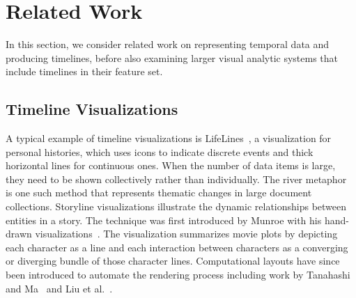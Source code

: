 \section{Related Work}
\label{sec:relatedwork}


In this section, we consider related work on representing temporal data and producing timelines, before also examining larger visual analytic systems that include timelines in their feature set.

\subsection{Timeline Visualizations}
A typical example of timeline visualizations is LifeLines~\cite{Plaisant1996a}, a visualization for personal histories, which uses icons to indicate discrete events and thick horizontal lines for continuous ones. When the number of data items is large, they need to be shown collectively rather than individually. The river metaphor~\cite{Havre2002} is one such method that represents thematic changes in large document collections. Storyline visualizations illustrate the dynamic relationships between entities in a story. The technique was first introduced by Munroe with his hand-drawn visualizations~\cite{Munroe2009}. The visualization summarizes movie plots by depicting each character as a line and each interaction between characters as a converging or diverging bundle of those character lines. Computational layouts have since been introduced to automate the rendering process including work by Tanahashi and Ma~\cite{Tanahashi2012} and Liu et al.~\cite{Liu2013}. 


